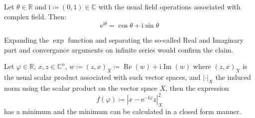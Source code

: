 	\begin{Thm}\label{theorem:euler formula}
    Let $\theta \in \mathbb{R}$ and $\mathrm{i} \coloneqq (0,1) \in \mathbb{C}$ with the usual field operations associated with 
	complex field. Then:
	\begin{equation*}
		\mathrm{e}^{\mathrm{i}\theta} = \cos \theta +  \mathrm{i}\sin \theta
	\end{equation*}
	\end{Thm}
	\begin{Proof}
		Expanding the $\exp$ function and separating the so-called Real and Imaginary part and convergance arguments 
	on infinite series would confirm the claim\cite{Rudin1987}\cite{Stein2003}. 
	\end{Proof}


	\begin{Prop}\label{theorem:min distance}
		Let $\varphi \in \mathbb{R}$, $x,z \in \mathbb{C}^n$, $w \coloneqq (z,x)_X \coloneqq \operatorname{Re}(w)+\mathrm{i}\operatorname{Im}(w)$ where $(z,x)_X$ is 
		the usual scalar product associated with such vector spaces, and $\left|\cdot\right|_X$ the induced norm using the scalar product on the vector space $X$, then the expression
		\begin{equation*}
			f(\varphi) \coloneqq \left|x-\mathrm{e}^{-\mathrm{i}\varphi}z\right|^2_X
		\end{equation*}
		has a minimum and the minimum can be calculated in a closed form manner.
		\end{Prop}
